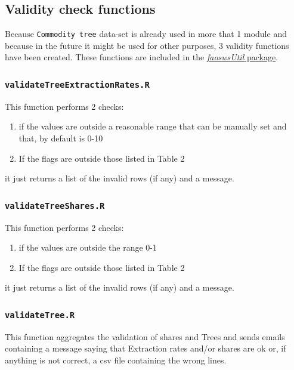 \documentclass[]{article}
\providecommand{\tightlist}{%
  \setlength{\itemsep}{0pt}\setlength{\parskip}{0pt}}
\begin{document}
\subsection{Validity check functions}\label{validity-check-functions}

Because \texttt{Commodity\ tree} data-set is already used in more that 1
module and because in the future it might be used for other purposes, 3
validity functions have been created. These functions are included in
the
\href{https://sdlc.fao.org/bitbucket/projects/SWS/repos/faoswsutil/browse/R}{\emph{faoswsUtil}
package}.

\subsubsection{\texorpdfstring{\texttt{validateTreeExtractionRates.R}}{validateTreeExtractionRates.R}}\label{validatetreeextractionrates.r}

This function performs 2 checks:

\begin{enumerate}
\def\labelenumi{\arabic{enumi}.}
\tightlist
\item
  if the values are outside a reasonable range that can be manually set
  and that, by default is 0-10
\item
  If the flags are outside those listed in Table 2
\end{enumerate}

it just returns a list of the invalid rows (if any) and a message.

\subsubsection{\texorpdfstring{\texttt{validateTreeShares.R}}{validateTreeShares.R}}\label{validatetreeshares.r}

This function performs 2 checks:

\begin{enumerate}
\def\labelenumi{\arabic{enumi}.}
\tightlist
\item
  if the values are outside the range 0-1
\item
  If the flags are outside those listed in Table 2
\end{enumerate}

it just returns a list of the invalid rows (if any) and a message.

\subsubsection{\texorpdfstring{\texttt{validateTree.R}}{validateTree.R}}\label{validatetree.r}

This function aggregates the validation of shares and Trees and sends
emails containing a message saying that Extraction rates and/or shares
are ok or, if anything is not correct, a csv file containing the wrong
lines.
\end{document}
